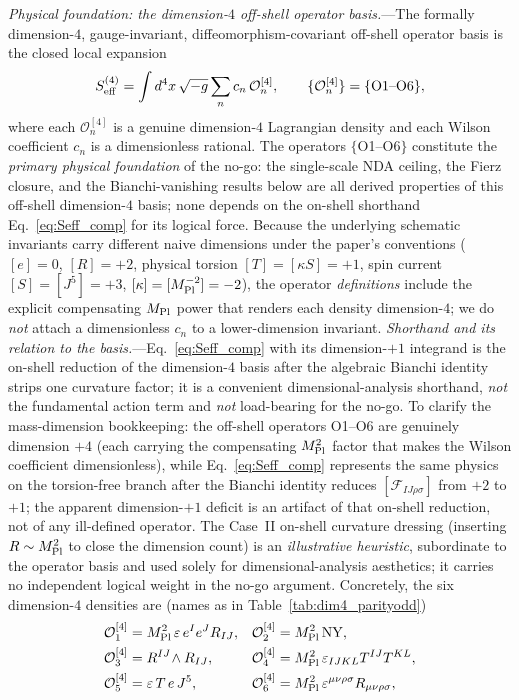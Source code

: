 \documentclass[aps,prd,twocolumn,superscriptaddress,showpacs,preprintnumbers,nofootinbib,longbibliography,floatfix]{revtex4-2}
\newcommand{\MPl}{M_{\rm Pl}}
\begin{document}
\emph{Physical foundation: the dimension-$4$ off-shell operator basis.}---The
formally dimension-$4$, gauge-invariant, diffeomorphism-covariant off-shell
operator basis is the closed local expansion
\begin{equation}\label{eq:Seff_dim4}
S_{\rm eff}^{(4)} = \int d^4x\,\sqrt{-g}\sum_{n} c_n\,\mathcal{O}_n^{[4]},
\qquad \{\mathcal{O}_n^{[4]}\}=\{\mathrm{O1}\text{--}\mathrm{O6}\},
\end{equation}
where each $\mathcal{O}_n^{[4]}$ is a genuine dimension-$4$ Lagrangian
density and each Wilson coefficient $c_n$ is a dimensionless rational.
The operators $\{$O1--O6$\}$ constitute the \emph{primary physical
foundation} of the no-go: the single-scale NDA ceiling, the Fierz closure,
and the Bianchi-vanishing results below are all derived properties of this
off-shell dimension-$4$ basis; none depends on the on-shell shorthand
Eq.~\eqref{eq:Seff_comp} for its logical force.
Because the underlying schematic invariants carry different naive
dimensions under the paper's conventions ($[e]=0$, $[R]=+2$, physical
torsion $[T]=[\kappa S]=+1$, spin current $[S]=[J^5]=+3$,
$[\kappa]=[\MPl^{-2}]=-2$), the operator \emph{definitions} include the
explicit compensating $\MPl$ power that renders each density dimension-$4$;
we do \emph{not} attach a dimensionless $c_n$ to a lower-dimension
invariant.
\emph{Shorthand and its relation to the basis.}---Eq.~\eqref{eq:Seff_comp}
with its dimension-$+1$ integrand is the on-shell reduction of the
dimension-$4$ basis after the algebraic Bianchi identity strips one curvature
factor; it is a convenient dimensional-analysis shorthand, \emph{not} the
fundamental action term and \emph{not} load-bearing for the no-go. To
clarify the mass-dimension bookkeeping: the off-shell operators O1--O6 are
genuinely dimension $+4$ (each carrying the compensating $\MPl^2$ factor that
makes the Wilson coefficient dimensionless), while Eq.~\eqref{eq:Seff_comp}
represents the same physics on the torsion-free branch after the Bianchi
identity reduces $[\mathcal{F}_{IJ\rho\sigma}]$ from $+2$ to $+1$; the
apparent dimension-$+1$ deficit is an artifact of that on-shell reduction,
not of any ill-defined operator. The Case~II on-shell curvature dressing
(inserting $R\sim\MPl^2$ to close the dimension count) is an
\emph{illustrative heuristic}, subordinate to the operator basis and used
solely for dimensional-analysis aesthetics; it carries no independent
logical weight in the no-go argument.
Concretely, the six dimension-$4$ densities are (names as in
Table~\ref{tab:dim4_parityodd})
\begin{align}\label{eq:dim4_defs}
\mathcal{O}_{1}^{[4]}&=\MPl^{2}\,\varepsilon\,e^I e^J R_{IJ},
& \mathcal{O}_{2}^{[4]}&=\MPl^{2}\,\mathrm{NY},\notag\\
\mathcal{O}_{3}^{[4]}&=R^{IJ}\!\wedge R_{IJ},
& \mathcal{O}_{4}^{[4]}&=\MPl^{2}\,\varepsilon_{IJKL}T^{IJ}T^{KL},\notag\\
\mathcal{O}_{5}^{[4]}&=\varepsilon\,T\,e\,J^5,
& \mathcal{O}_{6}^{[4]}&=\MPl^{2}\,\varepsilon^{\mu\nu\rho\sigma}R_{\mu\nu\rho\sigma},
\end{align}
\end{document}
